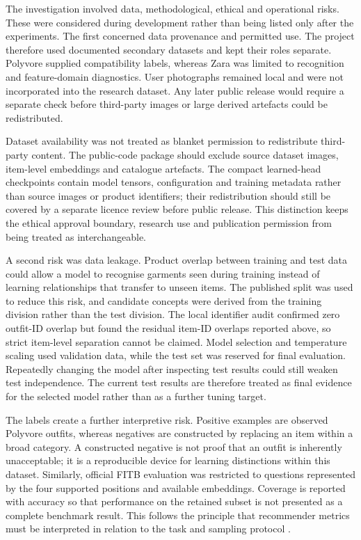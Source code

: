 The investigation involved data, methodological, ethical and operational
risks. These were considered during development rather than being listed only
after the experiments. The first concerned data provenance and permitted use.
The project therefore used documented secondary datasets and kept their roles
separate. Polyvore supplied compatibility labels, whereas Zara was limited to
recognition and feature-domain diagnostics. User photographs remained local
and were not incorporated into the research dataset. Any later public release would require a separate
check before third-party images or large derived artefacts could be
redistributed.

Dataset availability was not treated as blanket permission to redistribute
third-party content. The public-code package should exclude source dataset
images, item-level embeddings and catalogue artefacts. The compact learned-head
checkpoints contain model tensors, configuration and training metadata rather
than source images or product identifiers; their redistribution should still
be covered by a separate licence review before public release. This distinction
keeps the ethical approval boundary, research use and publication permission
from being treated as interchangeable.

A second risk was data leakage. Product overlap between training and test data
could allow a model to recognise garments seen during training instead of
learning relationships that transfer to unseen items. The published split was
used to reduce this risk, and candidate concepts were derived from the training
division rather than the test division. The local identifier audit confirmed
zero outfit-ID overlap but found the residual item-ID overlaps reported above,
so strict item-level separation cannot be claimed. Model selection and
temperature scaling used validation data, while the test set was reserved for
final evaluation. Repeatedly changing the model after inspecting test results
could still weaken test independence. The current test results are therefore
treated as final evidence for the selected model rather than as a further
tuning target.

The labels create a further interpretive risk. Positive examples are observed
Polyvore outfits, whereas negatives are constructed by replacing an item
within a broad category. A constructed negative is not proof that an outfit is
inherently unacceptable; it is a reproducible device for learning distinctions
within this dataset. Similarly, official FITB evaluation was restricted to
questions represented by the four supported positions and available
embeddings. Coverage is reported with accuracy so that performance on the
retained subset is not presented as a complete benchmark result. This follows
the principle that recommender metrics must be interpreted in relation to the
task and sampling protocol \parencite{herlocker2004evaluation}.

